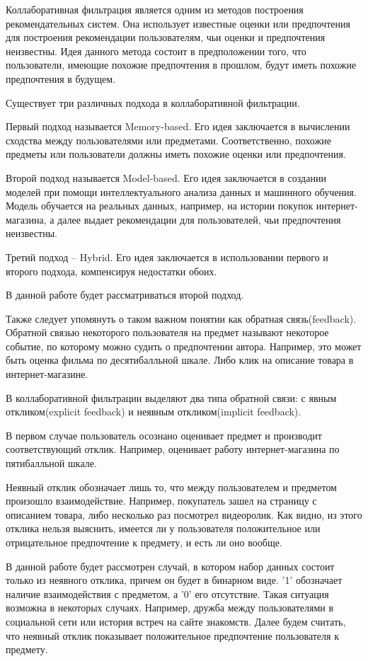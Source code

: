 \documentclass[14pt]{extarticle}
\begin{document}
Коллаборативная фильтрация является одним из методов построения рекомендательных систем. Она использует известные оценки или предпочтения  для построения рекомендации пользователям, чьи оценки и предпочтения неизвестны. Идея данного метода состоит в предположении того, что пользователи, имеющие похожие предпочтения в прошлом, будут иметь похожие предпочтения в будущем.



Существует три различных подхода в коллаборативной фильтрации.

Первый подход называется Memory-based. Его идея заключается в вычислении сходства между пользователями или предметами. Соответственно, похожие предметы или пользователи должны иметь похожие оценки или предпочтения.

Второй подход называется Model-based. Его идея заключается в создании моделей при помощи интеллектуального анализа данных и машинного обучения. Модель обучается на реальных данных, например, на истории покупок интернет-магазина, а далее выдает рекомендации для пользователей, чьи предпочтения неизвестны. 

Третий подход -- Hybrid. Его идея заключается в использовании первого и второго подхода, компенсируя недостатки обоих. 


В данной работе будет рассматриваться второй подход.

Также следует упомянуть о таком важном понятии как обратная связь(feedback). Обратной связью некоторого пользователя на предмет называют некоторое событие, по которому можно судить о предпочтении автора. 
Например, это может быть оценка фильма по десятибалльной шкале. Либо клик на описание товара в интернет-магазине.

В коллаборативной фильтрации выделяют два типа обратной связи: с явным откликом(explicit feedback) и неявным откликом(implicit feedback).

 В первом случае пользователь осознано оценивает предмет и производит соответствующий отклик. Например,  оценивает работу интернет-магазина по пятибалльной шкале.

Неявный отклик  обозначает лишь то, что между пользователем и предметом произошло взаимодействие. Например, покупатель зашел на страницу с описанием товара, либо несколько раз посмотрел  видеоролик. Как видно, из этого отклика нельзя выяснить, имеется ли у пользователя положительное или отрицательное предпочтение к предмету, и есть ли оно вообще.

В данной работе будет рассмотрен случай, в котором набор данных состоит только из неявного отклика, причем он будет в бинарном виде. '1'  обозначает наличие взаимодействия с предметом, а '0' его отсутствие.  Такая ситуация возможна в некоторых случаях. Например, дружба между пользователями в социальной сети или история встреч на сайте знакомств. Далее будем считать, что неявный отклик показывает положительное предпочтение пользователя к предмету.
\end{document}
